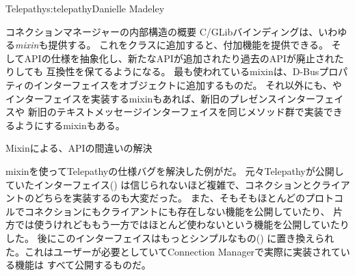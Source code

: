 \begin{aosachapter}{Telepathy}{s:telepathy}{Danielle Madeley}
\begin{aosasect1}{コネクションマネージャーの内部構造の概要}
C/GLibバインディングは、いわゆる\emph{mixin}も提供する。
これをクラスに追加すると、付加機能を提供できる。
そしてAPIの仕様を抽象化し、新たなAPIが追加されたり過去のAPIが廃止されたりしても
互換性を保てるようになる。
最も使われているmixinは、D-Busプロパティのインターフェイスをオブジェクトに追加するものだ。
それ以外にも、や
インターフェイスを実装するmixinもあれば、新旧のプレゼンスインターフェイスや
新旧のテキストメッセージインターフェイスを同じメソッド群で実装できるようにするmixinもある。


\begin{aosabox}{Mixinによる、APIの間違いの解決}

mixinを使ってTelepathyの仕様バグを解決した例がだ。
元々Telepathyが公開していたインターフェイス()
は信じられないほど複雑で、コネクションとクライアントのどちらを実装するのも大変だった。
また、そもそもほとんどのプロトコルでコネクションにもクライアントにも存在しない機能を公開していたり、
片方では使うけれどももう一方ではほとんど使わないという機能を公開していたりした。
後にこのインターフェイスはもっとシンプルなもの()
に置き換えられた。これはユーザーが必要としていてConnection Managerで実際に実装されている機能は
すべて公開するものだ。


\end{aosabox}
\end{aosasect1}
\end{aosachapter}
